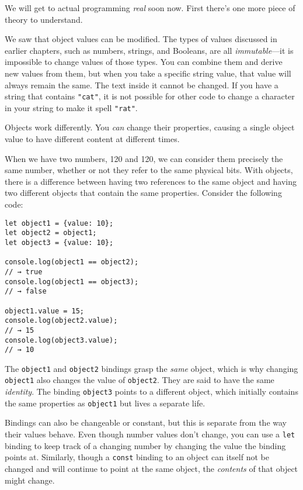 We will get to actual programming \emph{real} soon now. First there's one more piece of theory to understand.

We saw that object values can be modified. The types of values discussed in earlier chapters, such as numbers, strings, and Booleans, are all \emph{immutable}—it is impossible to change values of those types. You can combine them and derive new values from them, but when you take a specific string value, that value will always remain the same. The text inside it cannot be changed. If you have a string that contains \lstinline`"cat"`, it is not possible for other code to change a character in your string to make it spell \lstinline`"rat"`.

Objects work differently. You \emph{can} change their properties, causing a single object value to have different content at different times.

When we have two numbers, 120 and 120, we can consider them precisely the same number, whether or not they refer to the same physical bits. With objects, there is a difference between having two references to the same object and having two different objects that contain the same properties. Consider the following code:

\begin{lstlisting}
let object1 = {value: 10};
let object2 = object1;
let object3 = {value: 10};

console.log(object1 == object2);
// → true
console.log(object1 == object3);
// → false

object1.value = 15;
console.log(object2.value);
// → 15
console.log(object3.value);
// → 10
\end{lstlisting}
\noindent{}

The \lstinline`object1` and \lstinline`object2` bindings grasp the \emph{same} object, which is why changing \lstinline`object1` also changes the value of \lstinline`object2`. They are said to have the same \emph{identity}. The binding \lstinline`object3` points to a different object, which initially contains the same properties as \lstinline`object1` but lives a separate life.

Bindings can also be changeable or constant, but this is separate from the way their values behave. Even though number values don't change, you can use a \lstinline`let` binding to keep track of a changing number by changing the value the binding points at. Similarly, though a \lstinline`const` binding to an object can itself not be changed and will continue to point at the same object, the \emph{contents} of that object might change.

